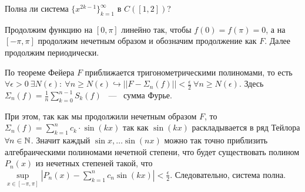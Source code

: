 \begin{problem}
    Полна ли система $\{x^{2k - 1}\}_{k = 1}^{\infty}$ в $C([1, 2])$?
\end{problem}

\begin{answer}
    Продолжим функцию на $[0, \pi]$ линейно так, чтобы $f(0) = f(\pi) = 0$, а на $[-\pi, \pi]$ продолжим нечетным образом и обозначим продолжение как $F$. Далее продолжим периодически.

    \noindent По теореме Фейера $F$  приближается тригонометрическими полиномами, то есть $\forall \epsilon > 0 \ \exists N(\epsilon) : \ \forall n \ge N(\epsilon) \hookrightarrow \left|\left| F - \Sigma_n(f)\right|\right| < \frac{\epsilon}{2} \ \forall n \ge N(\epsilon).$ Здесь $\Sigma_n(f) = \frac{1}{n} \sum\limits_{k = 0}^{n - 1}S_k(f)$ ~---~ сумма Фурье.

    \noindent При этом, так как мы продолжили нечетным образом $F$, то $\Sigma_n(f) = \sum\limits_{k = 1}^{n} c_k \cdot \sin(kx)$ так как $\sin(kx)$ раскладывается в ряд Тейлора $\forall n \in \mathbb{N}$. Значит каждый $\sin x, \dots \sin (nx)$ можно так точно приблизить алгебраическими полиномами нечетной степени, что будет существовать полином $P_n(x)$ из нечетных степеней такой, что $\sup\limits_{x \in [-\pi, \pi]} \left|P_n(x) - \sum\limits_{k = 1}^{n} c_n\sin (kx)\right| < \frac{\epsilon}{2}$. Следовательно, система полна.

\end{answer}